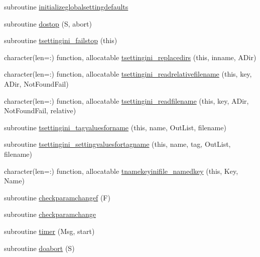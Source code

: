 \begin{DoxyCompactItemize}
\item 
subroutine \mbox{\hyperlink{namespacesettings_a10f55aa94b2ab604c1c3769a46fc6981}{initializeglobalsettingdefaults}}
\item 
subroutine \mbox{\hyperlink{namespacesettings_a3747d2293e80aacbc1e756c2d26fc75f}{dostop}} (S, abort)
\item 
subroutine \mbox{\hyperlink{namespacesettings_a6535550ffec6e7b81fcb60e053ea87b6}{tsettingini\+\_\+failstop}} (this)
\item 
character(len=\+:) function, allocatable \mbox{\hyperlink{namespacesettings_a3b2429bfa74ea486689b09597adc9791}{tsettingini\+\_\+replacedirs}} (this, inname, A\+Dir)
\item 
character(len=\+:) function, allocatable \mbox{\hyperlink{namespacesettings_a9fe4c031e947a169af96d96be88df87b}{tsettingini\+\_\+readrelativefilename}} (this, key, A\+Dir, Not\+Found\+Fail)
\item 
character(len=\+:) function, allocatable \mbox{\hyperlink{namespacesettings_aa7bf4212045f11786b51f9cf5fe34ffb}{tsettingini\+\_\+readfilename}} (this, key, A\+Dir, Not\+Found\+Fail, relative)
\item 
subroutine \mbox{\hyperlink{namespacesettings_ad76733b3c1bf3cec0d9401ce6d924a38}{tsettingini\+\_\+tagvaluesforname}} (this, name, Out\+List, filename)
\item 
subroutine \mbox{\hyperlink{namespacesettings_a25f07dfd89b1bd5d8754f0c08c0077ef}{tsettingini\+\_\+settingvaluesfortagname}} (this, name, tag, Out\+List, filename)
\item 
character(len=\+:) function, allocatable \mbox{\hyperlink{namespacesettings_a5cc488a2d56e898983e233e99a14cee0}{tnamekeyinifile\+\_\+namedkey}} (this, Key, Name)
\item 
subroutine \mbox{\hyperlink{namespacesettings_a7530516bc4d95e285559b9952d6f0dc2}{checkparamchangef}} (F)
\item 
subroutine \mbox{\hyperlink{namespacesettings_abd4643446df7076be97337eb9aa2f2e9}{checkparamchange}}
\item 
subroutine \mbox{\hyperlink{namespacesettings_aae1de2bfeb89f23588e7f18024be2a44}{timer}} (Msg, start)
\item 
subroutine \mbox{\hyperlink{namespacesettings_afa3df86ab753e05244ab370242ab2e5a}{doabort}} (S)
\end{DoxyCompactItemize}
